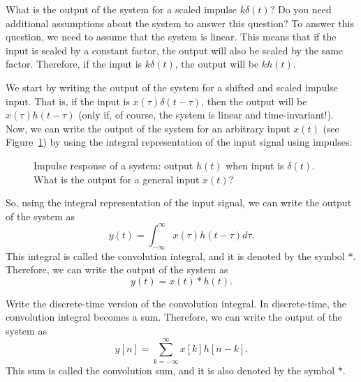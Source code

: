 \begin{popquiz}
    What is the output of the system for a scaled impulse $k \delta(t)$? Do you need additional assumptions about the system to answer this question?
    \popqsplit
    To answer this question, we need to assume that the system is linear. This means that if the input is scaled by a constant factor, the output will also be scaled by the same factor. Therefore, if the input is $k \delta(t)$, the output will be $k h(t)$.
\end{popquiz}
We start by writing the output of the system for a shifted and scaled impulse input. That is, if the input is $x(\tau) \delta(t - \tau)$, then the output will be $x(\tau) h(t - \tau)$ (only if, of course, the system is linear and time-invariant!).
Now, we can write the output of the system for an arbitrary input $x(t)$ (see Figure~\ref{fig:convolution-buildup}) by using the integral representation of the input signal using impulses:
\begin{figure}[h]
\centering
{}
\caption{Impulse response of a system: output $h(t)$ when input is $\delta(t)$. What is the output for a general input $x(t)$?}
\label{fig:convolution-buildup}
\end{figure}
So, using the integral representation of the input signal, we can write the output of the system as
\[
y(t) = \int_{-\infty}^{\infty} x(\tau) h(t - \tau) d\tau.
\]
This integral is called the convolution integral, and it is denoted by the symbol $*$. Therefore, we can write the output of the system as
\[
y(t) = x(t) * h(t).
\]
\begin{popquiz}
    Write the discrete-time version of the convolution integral.
    \popqsplit
    In discrete-time, the convolution integral becomes a sum. Therefore, we can write the output of the system as
    \[
    y[n] = \sum_{k=-\infty}^{\infty} x[k] h[n - k].
    \]
    This sum is called the convolution sum, and it is also denoted by the symbol $*$.
\end{popquiz}
